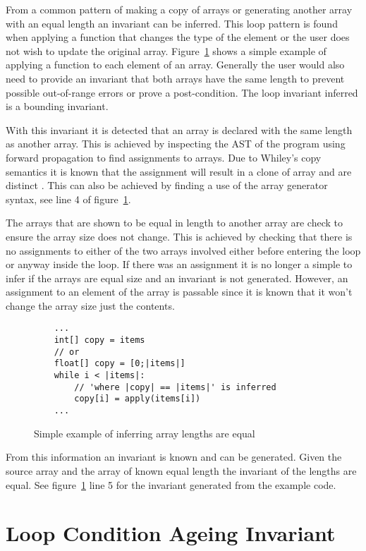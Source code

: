 From a common pattern of making a copy of arrays or generating another array
with an equal length an invariant can be inferred.
This loop pattern is found when applying a function that changes the type of
the element or the user does not wish to update the original array.
Figure~\ref{lst:whiley-length} shows a simple example of applying a function
 to each element of an array.
Generally the user would also need to provide an invariant that both arrays
have the same length to prevent possible out-of-range errors or prove a
post-condition.
The loop invariant inferred is a bounding invariant.

With this invariant it is detected that an array is declared with the same
length as another array.
This is achieved by inspecting the AST of the program
using forward propagation to find assignments to arrays.
Due to Whiley's copy semantics it is known that the assignment will result
in a clone of array and are distinct \cite{whiley-origin} \cite{whiley-arrays}.
This can also be achieved by finding a use of the array
generator syntax, see line 4 of figure~\ref{lst:whiley-length}.

The arrays that are shown to be equal in length to another array are
check to ensure the array size does not change.
This is achieved by checking that there is no assignments to either
of the two arrays involved either before entering the loop or
anyway inside the loop.
If there was an assignment it is no longer a simple to infer if
the arrays are equal size and an invariant is not generated.
However, an assignment to an element of the array is passable since it
is known that it won't change the array size just the contents.

\begin{figure}[ht]
\begin{lstlisting}
    ...
    int[] copy = items
    // or
    float[] copy = [0;|items|]
    while i < |items|:
        // 'where |copy| == |items|' is inferred
        copy[i] = apply(items[i])
    ...
\end{lstlisting}
\caption{Simple example of inferring array lengths are equal}
\label{lst:whiley-length}
\end{figure}

From this information an invariant is known and can be generated.
Given the source array and the array of known equal length the
invariant of the lengths are equal.
See figure~\ref{lst:whiley-length} line 5 for the invariant generated
from the example code.

\section{Loop Condition Ageing Invariant}
